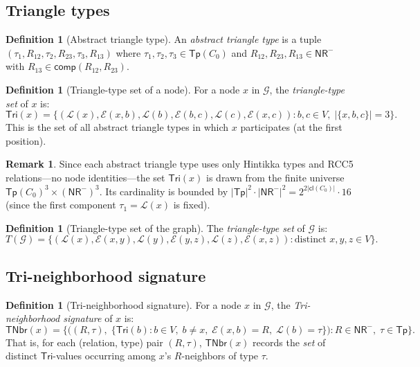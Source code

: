 \documentclass[a4paper,11pt]{article}
\theoremstyle{definition}
\newtheorem{definition}[theorem]{Definition}
\newtheorem{remark}[theorem]{Remark}
\newcommand{\comp}{\ensuremath{\mathsf{comp}}}
\newcommand{\cl}{\ensuremath{\mathsf{cl}}}
\newcommand{\Tp}{\ensuremath{\mathsf{Tp}}}
\newcommand{\NR}{\ensuremath{\mathsf{NR}}}
\newcommand{\Tri}{\ensuremath{\mathsf{Tri}}}
\newcommand{\TNbr}{\ensuremath{\mathsf{TNbr}}}
\newcommand{\GG}{\ensuremath{\mathcal{G}}}
\newcommand{\LL}{\ensuremath{\mathcal{L}}}
\newcommand{\EE}{\ensuremath{\mathcal{E}}}
\begin{document}
\subsection{Triangle types}\label{sec:tri-types}

\begin{definition}[Abstract triangle type]\label{def:tri}
An \emph{abstract triangle type} is a tuple
$(\tau_1, R_{12}, \tau_2, R_{23}, \tau_3, R_{13})$ where
$\tau_1, \tau_2, \tau_3 \in \Tp(C_0)$ and
$R_{12}, R_{23}, R_{13} \in \NR^{-}$ with
$R_{13} \in \comp(R_{12}, R_{23})$.
\end{definition}

\begin{definition}[Triangle-type set of a node]\label{def:tri-set}
For a node $x$ in $\GG$, the \emph{triangle-type set} of $x$ is:
\[
\Tri(x) = \bigl\{
  (\LL(x), \EE(x,b), \LL(b), \EE(b,c), \LL(c), \EE(x,c))
  : b, c \in V,\; |\{x,b,c\}| = 3
\bigr\}.
\]
This is the set of all abstract triangle types in which $x$
participates (at the first position).
\end{definition}

\begin{remark}
Since each abstract triangle type uses only Hintikka types
and RCC5 relations---no node identities---the set $\Tri(x)$
is drawn from the finite universe
$\Tp(C_0)^3 \times (\NR^{-})^3$.  Its cardinality is bounded
by $|\Tp|^2 \cdot |\NR^{-}|^2 = 2^{2|\cl(C_0)|} \cdot 16$
(since the first component $\tau_1 = \LL(x)$ is fixed).
\end{remark}

\begin{definition}[Triangle-type set of the graph]\label{def:T}
The \emph{triangle-type set} of $\GG$ is:
\[
T(\GG) = \bigl\{
  (\LL(x), \EE(x,y), \LL(y), \EE(y,z), \LL(z), \EE(x,z))
  : \text{distinct } x, y, z \in V
\bigr\}.
\]
\end{definition}

\subsection{Tri-neighborhood signature}\label{sec:tri-nbr}

\begin{definition}[Tri-neighborhood signature]\label{def:tri-nbr}
For a node $x$ in $\GG$, the \emph{Tri-neighborhood signature}
of $x$ is:
\[
\TNbr(x) = \bigl\{
  \bigl((R, \tau),\; \{\Tri(b) : b \in V,\; b \neq x,\;
    \EE(x,b) = R,\; \LL(b) = \tau\}\bigr)
  : R \in \NR^{-},\; \tau \in \Tp
\bigr\}.
\]
That is, for each (relation, type) pair $(R, \tau)$,
$\TNbr(x)$ records the \emph{set} of distinct $\Tri$-values
occurring among $x$'s $R$-neighbors of type $\tau$.
\end{definition}
\end{document}
